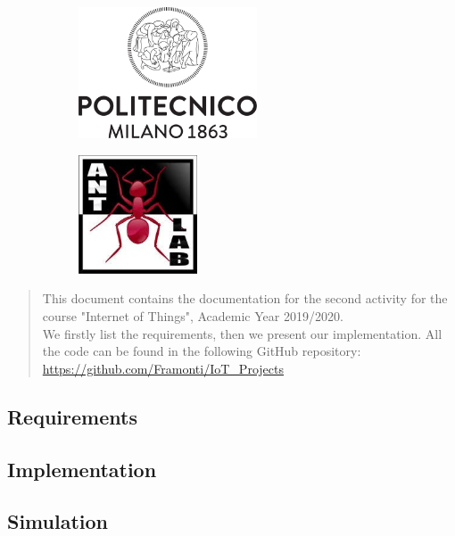 \documentclass[12pt]{article}
\begin{document}
\begin{titlepage}

\begin{figure}[h]
	\begin{subfigure}{0.5\textwidth}
		\includegraphics[width=150pt, left]{Logo_Politecnico_Milano.png}
	\end{subfigure} 
	\begin{subfigure}{0.5\textwidth}
		\includegraphics[width=100pt, right]{Ant_Lab_Logo.png}
	\end{subfigure}
\end{figure} 
 

\vfill

\end{titlepage}
\begin{abstract}
This document contains the documentation for the second activity for the course "Internet of Things", Academic Year 2019/2020. \\
We firstly list the requirements, then we present our implementation. All the code can be found in the following GitHub repository: \url{https://github.com/Framonti/IoT_Projects}
\end{abstract}
\subsection{Requirements}

\subsection{Implementation}

\subsection{Simulation}
\end{document}
